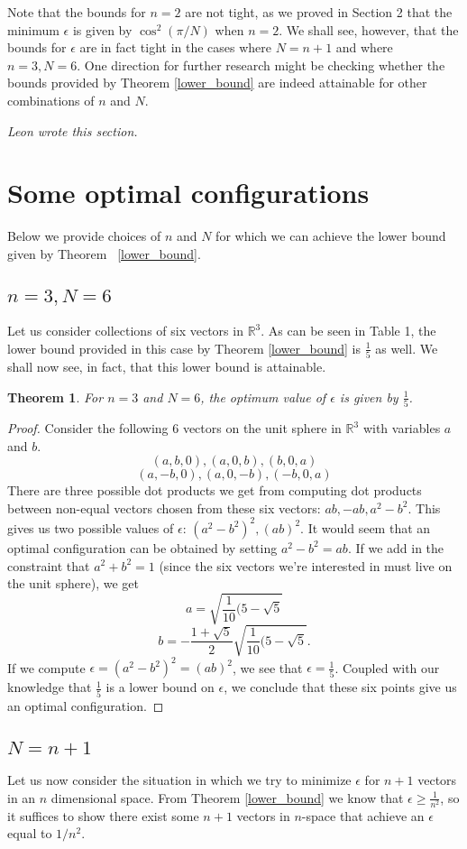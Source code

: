 \documentclass[11pt,letterpaper,twoside,english]{article}
\theoremstyle{theorem}
\newtheorem{theorem}{Theorem}[section]
\theoremstyle{remark}
\providecommand{\R}{\mathbb{R}}
\begin{document}
Note that the bounds for $n=2$ are not tight, as we proved in Section 2 that the minimum $\epsilon$ is given by $\cos^2(\pi/N)$ when $n=2$. We shall see, however, that the bounds for $\epsilon$ are in fact tight in the cases where $N=n+1$ and where $n=3, N=6$. One direction for further research might be checking whether the bounds provided by Theorem \ref{lower_bound} are indeed attainable for other combinations of $n$ and $N$.

{\itshape Leon wrote this section.}


\section{Some optimal configurations}
Below we provide choices of $n$ and $N$ for which we can achieve the lower bound given by Theorem ~\ref{lower_bound}.
\subsection{$n=3,N=6$}
Let us consider collections of six vectors in $\mathbb R^3$. As can be seen in Table 1, the lower bound provided in this case by Theorem \ref{lower_bound} is $\frac 1 5$ as well. We shall now see, in fact, that this lower bound is attainable.
\begin{theorem}
For $n=3$ and $N=6$, the optimum value of $\epsilon$ is given by $\frac 1 5$.
\end{theorem}
\begin{proof}Consider the following 6 vectors on the unit sphere in $\R^3$ with variables $a$ and $b$. 
$$
(a,b,0),(a,0,b),(b,0,a)
$$
$$
(a,-b,0),(a,0,-b),(-b,0,a)
$$
There are three possible dot products we get from computing dot products between non-equal vectors chosen from these six vectors: $ab,-ab,a^2-b^2$. This gives us two possible values of $\epsilon$: $(a^2-b^2)^2,(ab)^2$. It would seem that an optimal configuration can be obtained by setting $a^2-b^2=ab$. If we add in the constraint that $a^2+b^2=1$ (since the six vectors we're interested in must live on the unit sphere), we get
$$
a=\sqrt{\frac{1}{10}(5-\sqrt{5}}$$$$ b=-\frac{1+\sqrt{5}}{2}\sqrt{\frac{1}{10}(5-\sqrt{5}}. 
$$
If we compute $\epsilon=(a^2-b^2)^2=(ab)^2$, we see that $\epsilon=\frac{1}{5}$. Coupled with our knowledge that $\frac 1 5$ is a lower bound on $\epsilon$, we conclude that these six points give us an optimal configuration.\end{proof}
\subsection{$N=n+1$}
Let us now consider the situation in which we try to minimize $\epsilon$ for $n+1$ vectors in an $n$ dimensional space. From Theorem \ref{lower_bound} we know that $\epsilon\ge \frac{1}{n^2}$, so it suffices to show there exist some $n+1$ vectors in $n$-space that achieve an $\epsilon$ equal to $1/n^2$.
\end{document}
